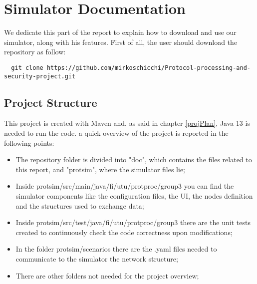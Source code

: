 \chapter{Simulator Documentation}\label{simulatorDoc}
We dedicate this part of the report to explain how to download and use our simulator, along with his features.\newline
First of all, the user should download the repository as follow:
\begin{verbatim}
  git clone https://github.com/mirkoschicchi/Protocol-processing-and-security-project.git
\end{verbatim}

\section{Project Structure}
This project is created with Maven and, as said in chapter \ref{projPlan}, Java 13 is needed to run the code.\newline
a quick overview of the project is reported in the following points:
\begin{itemize}
  \item The repository folder is divided into "doc", which contains the files related to this report, and "protsim", where the simulator files lie;
  \item Inside protsim/src/main/java/fi/utu/protproc/group3 you can find the simulator components like the configuration files, the UI, the nodes definition and the structures used to exchange data;
  \item Inside protsim/src/test/java/fi/utu/protproc/group3 there are the unit tests created to continuously check the code correctness upon modifications;
  \item In the folder protsim/scenarios there are the .yaml files needed to communicate to the simulator the network structure;
  \item There are other folders not needed for the project overview;
\end{itemize}

